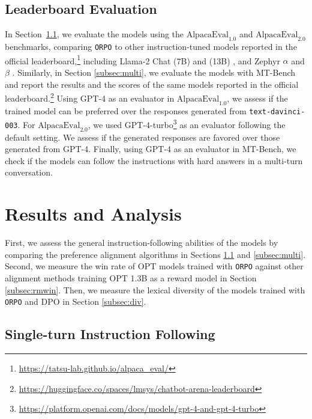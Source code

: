 \subsection{Leaderboard Evaluation} In Section~\ref{subsec:instruct},  we evaluate the models using the $\text{AlpacaEval}_{1.0}$ and $\text{AlpacaEval}_{2.0}$ \citep{alpaca_eval} benchmarks, comparing \texttt{ORPO} to other instruction-tuned models reported in the official leaderboard,\footnote{\url{https://tatsu-lab.github.io/alpaca_eval/}} including Llama-2 Chat (7B) and (13B) \citep{touvron2023llama}, and Zephyr $\alpha$ and $\beta$ \citep{almazrouei2023falcon}. Similarly, in Section \ref{subsec:multi}, we evaluate the models with MT-Bench \citep{zheng_judging_2023} and report the results and the scores of the same models reported in the official leaderboard.\footnote{\url{https://huggingface.co/spaces/lmsys/chatbot-arena-leaderboard}}
Using GPT-4 \citep{achiam2023gpt} as an evaluator in $\text{AlpacaEval}_{1.0}$, we assess if the trained model can be preferred over the responses generated from \texttt{text-davinci-003}. For $\text{AlpacaEval}_{2.0}$, we used GPT-4-turbo\footnote{\url{https://platform.openai.com/docs/models/gpt-4-and-gpt-4-turbo}} as an evaluator following the default setting. We assess if the generated responses are favored over those generated from GPT-4. Finally, using GPT-4 as an evaluator in MT-Bench, we check if the models can follow the instructions with hard answers in a multi-turn conversation.

\section{Results and Analysis}\label{sec:result}

First, we assess the general instruction-following abilities of the models by comparing the preference alignment algorithms in Sections \ref{subsec:instruct} and \ref{subsec:multi}. Second, we measure the win rate of OPT models trained with \texttt{ORPO} against other alignment methods training OPT 1.3B as a reward model in Section \ref{subsec:rmwin}. Then, we measure the lexical diversity of the models trained with \texttt{ORPO} and DPO in Section \ref{subsec:div}.

\subsection{Single-turn Instruction Following}\label{subsec:instruct}


